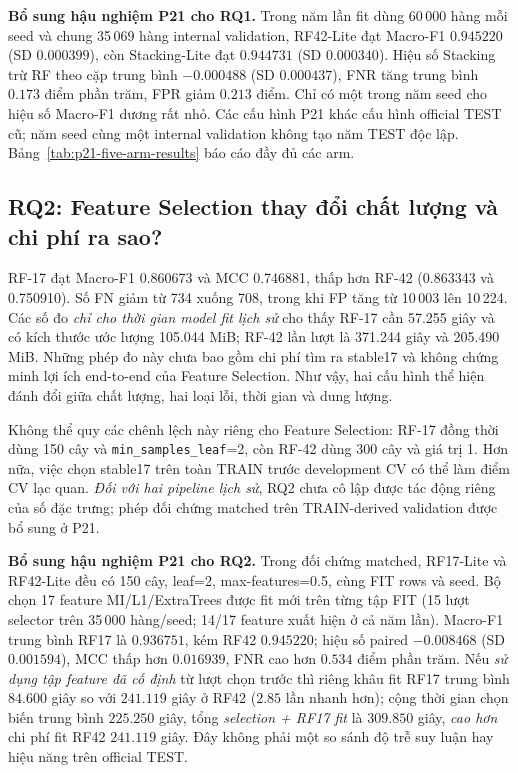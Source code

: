 \noindent\textbf{Bổ sung hậu nghiệm P21 cho RQ1.}
Trong năm lần fit dùng 60\,000 hàng mỗi seed và chung 35\,069 hàng internal validation, RF42-Lite đạt Macro-F1 $0.945220$ (SD $0.000399$), còn Stacking-Lite đạt $0.944731$ (SD $0.000340$). Hiệu số Stacking trừ RF theo cặp trung bình $-0.000488$ (SD $0.000437$), FNR tăng trung bình $0.173$ điểm phần trăm, FPR giảm $0.213$ điểm. Chỉ có một trong năm seed cho hiệu số Macro-F1 dương rất nhỏ. Các cấu hình P21 khác cấu hình official TEST cũ; năm seed cùng một internal validation không tạo năm TEST độc lập. Bảng~\ref{tab:p21-five-arm-results} báo cáo đầy đủ các arm.

\subsection{RQ2: Feature Selection thay đổi chất lượng và chi phí ra sao?}
\label{sec:revision-rq2}
RF-17 đạt Macro-F1 0.860673 và MCC 0.746881, thấp hơn RF-42 (0.863343 và 0.750910). Số FN giảm từ 734 xuống 708, trong khi FP tăng từ 10\,003 lên 10\,224. Các số đo \emph{chỉ cho thời gian model fit lịch sử} cho thấy RF-17 cần 57.255 giây và có kích thước ước lượng 105.044 MiB; RF-42 lần lượt là 371.244 giây và 205.490 MiB. Những phép đo này chưa bao gồm chi phí tìm ra stable17 và không chứng minh lợi ích end-to-end của Feature Selection. Như vậy, hai cấu hình thể hiện đánh đổi giữa chất lượng, hai loại lỗi, thời gian và dung lượng.

Không thể quy các chênh lệch này riêng cho Feature Selection: RF-17 đồng thời dùng 150 cây và \texttt{min\_samples\_leaf}=2, còn RF-42 dùng 300 cây và giá trị 1. Hơn nữa, việc chọn stable17 trên toàn TRAIN trước development CV có thể làm điểm CV lạc quan. \emph{Đối với hai pipeline lịch sử}, RQ2 chưa cô lập được tác động riêng của số đặc trưng; phép đối chứng matched trên TRAIN-derived validation được bổ sung ở P21.

\noindent\textbf{Bổ sung hậu nghiệm P21 cho RQ2.}
Trong đối chứng matched, RF17-Lite và RF42-Lite đều có 150 cây, leaf=2, max-features=0.5, cùng FIT rows và seed. Bộ chọn 17 feature MI/L1/ExtraTrees được fit mới trên từng tập FIT (15 lượt selector trên 35\,000 hàng/seed; 14/17 feature xuất hiện ở cả năm lần). Macro-F1 trung bình RF17 là $0.936751$, kém RF42 $0.945220$; hiệu số paired $-0.008468$ (SD $0.001594$), MCC thấp hơn $0.016939$, FNR cao hơn $0.534$ điểm phần trăm. Nếu \emph{sử dụng tập feature đã cố định} từ lượt chọn trước thì riêng khâu fit RF17 trung bình $84.600$ giây so với $241.119$ giây ở RF42 ($2.85$ lần nhanh hơn); cộng thời gian chọn biến trung bình $225.250$ giây, tổng \emph{selection + RF17 fit} là $309.850$ giây, \emph{cao hơn} chi phí fit RF42 $241.119$ giây. Đây không phải một so sánh độ trễ suy luận hay hiệu năng trên official TEST.

